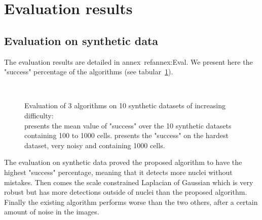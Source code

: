 

\section{Evaluation results}


\subsection{Evaluation on synthetic data}

The evaluation results are detailed in annex~ref{annex:Eval}. We present here the "success" percentage of the algorithms (see tabular~\ref{tab:simuSuccess}).
\begin{figure}[htb]
\begin{center}
\\
%
\end{center}
\caption{Evaluation of 3 algorithms on 10 synthetic datasets of increasing difficulty:\\
 presents the mean value of "success" over the 10 synthetic datasets containing 100 to 1000 cells.
 presents the "success" on the hardest dataset, very noisy and containing 1000 cells.
}
\label{tab:simuSuccess}
\end{figure}
The evaluation on synthetic data proved the proposed algorithm to have the highest "success" percentage,
meaning that it detects more nuclei without mistakes. Then comes the scale constrained Laplacian of Gaussian which is very robust
but has more detections outside of nuclei than the proposed algorithm. Finally the existing algorithm performs worse than the two others,
after a certain amount of noise in the images.


